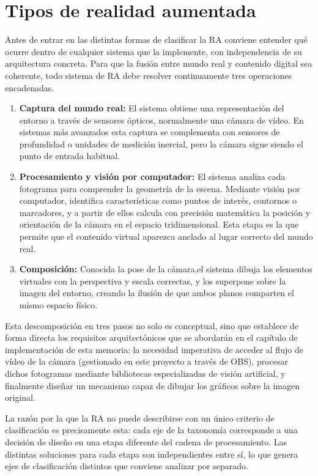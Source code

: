 \section{Tipos de realidad aumentada}
\label{sec:tipos_ra}
Antes de entrar en las distintas formas de clasificar la RA conviene entender qué ocurre dentro de cualquier sistema que la implemente, con independencia de su arquitectura concreta. Para que la fusión entre mundo real y contenido digital sea coherente, todo sistema de RA debe resolver continuamente tres operaciones encadenadas.

\begin{enumerate}
    \item \label{it:captura} \textbf{Captura del mundo real:} El sistema obtiene una representación del entorno a través de sensores ópticos, normalmente una cámara de vídeo. En sistemas más avanzados esta captura se complementa con sensores de profundidad o unidades de medición inercial, pero la cámara sigue siendo el punto de entrada habitual.
    \item \label{it:procesamiento}\textbf{Procesamiento y visión por computador:} El sistema analiza cada fotograma para comprender la geometría de la escena. Mediante visión por computador, identifica características como puntos de interés, contornos o marcadores, y a partir de ellos calcula con precisión matemática la posición y orientación de la cámara en el espacio tridimensional. Esta etapa es la que permite que el contenido virtual aparezca anclado al lugar correcto del mundo real.
    \item \label{it:composicion} \textbf{Composición:} Conocida la pose de la cámara,el sistema dibuja los elementos virtuales con la perspectiva y escala correctas, y los superpone sobre la imagen del entorno, creando la ilusión de que ambos planos comparten el mismo espacio físico.
\end{enumerate}
Esta descomposición en tres pasos no solo es conceptual, sino que establece de forma directa los requisitos arquitectónicos que se abordarán en el capítulo de implementación de esta memoria: la necesidad imperativa de acceder al flujo de vídeo de la cámara (gestionado en este proyecto a través de OBS), procesar dichos fotogramas mediante bibliotecas especializadas de visión artificial, y finalmente diseñar un mecanismo capaz de dibujar los gráficos sobre la imagen original.

La razón por la que la RA no puede describirse con un único criterio de clasificación es precisamente esta: cada eje de la taxonomía corresponde a una decisión de diseño en una etapa diferente del cadena de procesamiento. Las distintas soluciones para cada etapa son independientes entre sí, lo que genera ejes de clasificación distintos que conviene analizar por separado.

